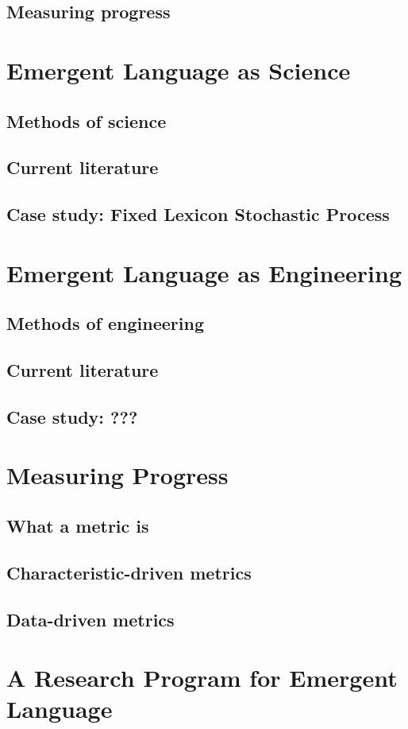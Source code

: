 \documentclass[letterpaper]{report}
\begin{document}
\section{Measuring progress}

\chapter{Emergent Language as Science}
\section{Methods of science}
\section{Current literature}
\section{Case study: Fixed Lexicon Stochastic Process}

\chapter{Emergent Language as Engineering}
\section{Methods of engineering}
\section{Current literature}
\section{Case study: ???}

\chapter{Measuring Progress}
\section{What a metric is}
\section{Characteristic-driven metrics}
\section{Data-driven metrics}

\chapter{A Research Program for Emergent Language}




\end{document}

